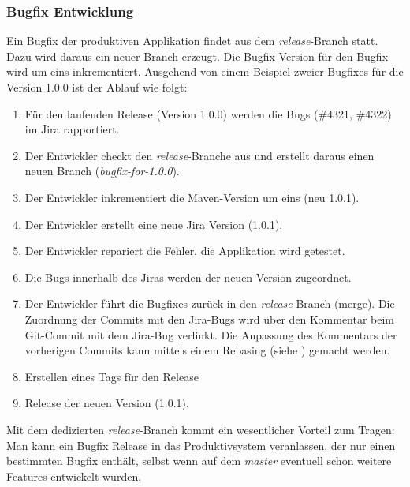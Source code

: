 \subsubsection{Bugfix Entwicklung}
Ein Bugfix der produktiven Applikation findet aus dem \textit{release}-Branch statt. Dazu wird daraus ein neuer Branch erzeugt. Die Bugfix-Version für den Bugfix wird um eins inkrementiert. Ausgehend von einem Beispiel zweier Bugfixes für die Version 1.0.0 ist der Ablauf wie folgt:
\begin{enumerate}
\item Für den laufenden Release (Version 1.0.0) werden die Bugs (\#4321, \#4322) im Jira rapportiert.
\item Der Entwickler checkt den \textit{release}-Branche aus und erstellt daraus einen neuen Branch (\textit{bugfix-for-1.0.0}).
\item Der Entwickler inkrementiert die Maven-Version um eins (neu 1.0.1).
\item Der Entwickler erstellt eine neue Jira Version (1.0.1).
\item Der Entwickler repariert die Fehler, die Applikation wird getestet.
\item Die Bugs innerhalb des Jiras werden der neuen Version zugeordnet.
\item Der Entwickler führt die Bugfixes zurück in den \textit{release}-Branch (merge). Die Zuordnung der Commits mit den Jira-Bugs wird über den Kommentar beim Git-Commit mit dem Jira-Bug verlinkt. Die Anpassung des Kommentars der vorherigen Commits kann mittels einem Rebasing (siehe \cite{dilger201111}) gemacht werden.
\item Erstellen eines Tags für den Release
\item Release der neuen Version (1.0.1).
\end{enumerate}
Mit dem dedizierten \textit{release}-Branch kommt ein wesentlicher Vorteil zum Tragen: Man kann ein Bugfix Release in das Produktivsystem veranlassen, der nur einen bestimmten Bugfix enthält, selbst wenn auf dem \textit{master} eventuell schon weitere Features entwickelt wurden.

